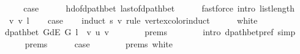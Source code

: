 \begin{isabellebody}
\ {}\isanewline
\ \ \isamarkupfalse%
\ {\isacharquery}{\kern0pt}case\isanewline
\ \ \ \ \isamarkupfalse%
\ hd{\isacharunderscore}{\kern0pt}of{\isacharunderscore}{\kern0pt}dpath{\isacharunderscore}{\kern0pt}bet{\isacharprime}{\kern0pt}\ last{\isacharunderscore}{\kern0pt}of{\isacharunderscore}{\kern0pt}dpath{\isacharunderscore}{\kern0pt}bet\isanewline
\ \ \ \ \isamarkupfalse%
\ {\isacharparenleft}{\kern0pt}fastforce\ intro{\isacharcolon}{\kern0pt}\ list{\isacharunderscore}{\kern0pt}length{\isacharunderscore}{\kern0pt}{}{\isacharparenright}{\kern0pt}\isanewline
{}\isamarkupfalse%
\isanewline
\ \ \isamarkupfalse%
\ {\isacharparenleft}{\kern0pt}{}\ v\ v{\isacharprime}{\kern0pt}\ l{\isacharparenright}{\kern0pt}\isanewline
\ \ \isamarkupfalse%
\ {\isacharquery}{\kern0pt}case\isanewline
\ \ \isamarkupfalse%
\ {\isacharparenleft}{\kern0pt}induct\ s\ v\ rule{\isacharcolon}{\kern0pt}\ vertex{\isacharunderscore}{\kern0pt}color{\isacharunderscore}{\kern0pt}induct{\isacharparenright}{\kern0pt}\isanewline
\ \ \ \ \isamarkupfalse%
\ white\isanewline
\ \ \ \ \isamarkupfalse%
\ {\isachardoublequoteopen}dpath{\isacharunderscore}{\kern0pt}bet\ {\isacharparenleft}{\kern0pt}G{\isachardot}{\kern0pt}dE\ G{\isacharparenright}{\kern0pt}\ {\isacharparenleft}{\kern0pt}l\ {\isacharat}{\kern0pt}\ {\isacharbrackleft}{\kern0pt}v{\isacharbrackright}{\kern0pt}{\isacharparenright}{\kern0pt}\ u\ v{\isachardoublequoteclose}\isanewline
\ \ \ \ \ \ \isamarkupfalse%
\ {\isachardoublequoteopen}{}{\isachardot}{\kern0pt}prems{\isachardoublequoteclose}{\isacharparenleft}{\kern0pt}{}{\isacharparenright}{\kern0pt}\isanewline
\ \ \ \ \ \ \isamarkupfalse%
\ {\isacharparenleft}{\kern0pt}intro\ dpath{\isacharunderscore}{\kern0pt}bet{\isacharunderscore}{\kern0pt}pref{\isacharparenright}{\kern0pt}\ simp\isanewline
\ \ \ \ \isamarkupfalse%
\ {\isachardoublequoteopen}{}{\isachardot}{\kern0pt}prems{\isachardoublequoteclose}{\isacharparenleft}{\kern0pt}{}{\isacharparenright}{\kern0pt}\isanewline
\ \ \ \ \isamarkupfalse%
\ {\isacharquery}{\kern0pt}case\isanewline
\ \ \ \ \ \ \isamarkupfalse%
\ {\isachardoublequoteopen}{}{\isachardot}{\kern0pt}prems{\isachardoublequoteclose}{\isacharparenleft}{\kern0pt}{}{\isacharparenright}{\kern0pt}\ white\isanewline
\ \ \ \ \ \ \isamarkupfalse%

\end{isabellebody}
